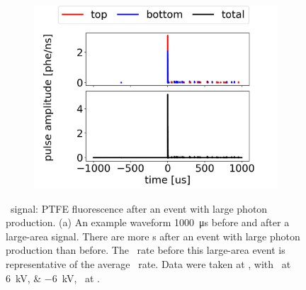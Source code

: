 \begin{figure}[!p]
	\centering
   	\begin{subfigure}[b]{1.0\textwidth}
   	\centering
   	\includegraphics[width=\figurewidth,clip,trim={0 0 0 0}]{Figures/GasTest/exampleWaveforms/proc64767PTFEFluo2x.jpg}
   	\caption{}
   	\label{fig:ptfe fluo b}
   \end{subfigure}
	\caption[\gtest\ signal: PTFE fluorescence after an event with large photon production.]{\gtest\ signal: PTFE fluorescence after an event with large photon production. (a) An example waveform \SI{1000}{\us} before and after a large-area signal. There are more \sphe s after an event with large photon production than before. The \sphe\ rate before this large-area event is representative of the average \sphe\ rate. Data were taken at , with \opvtvb\ at \SIlist{+6;-6}{kV}, \opgd\ at \standarddensity .}
	\label{fig:ptfe fluo}
\end{figure}
